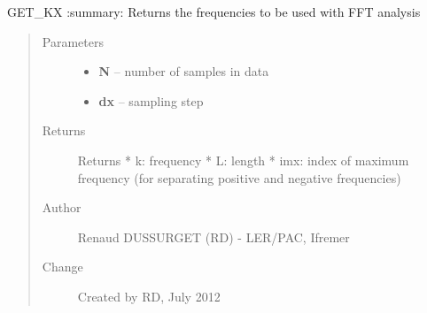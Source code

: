 \documentclass[letterpaper,10pt,english]{sphinxmanual}
\begin{document}

\begin{fulllineitems}
\label{altimetry.tools.spectrum:altimetry.tools.spectrum.get_kx}
GET\_KX
:summary: Returns the frequencies to be used with FFT analysis
\begin{quote}\begin{description}
\item[{Parameters}] \leavevmode\begin{itemize}
\item {} 
\textbf{N} -- number of samples in data

\item {} 
\textbf{dx} -- sampling step

\end{itemize}

\item[{Returns}] \leavevmode
Returns
* k: frequency
* L: length
* imx: index of maximum frequency (for separating positive and negative frequencies)

\item[{Author }] \leavevmode
Renaud DUSSURGET (RD) - LER/PAC, Ifremer

\item[{Change }] \leavevmode
Created by RD, July 2012

\end{description}\end{quote}

\end{fulllineitems}

\end{document}
